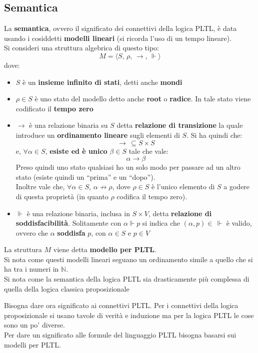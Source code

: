 \subsection{Semantica}
\begin{definizione}
  La \textbf{semantica}, ovvero il significato dei connettivi della logica PLTL,
  è data usando i cosiddetti \textbf{modelli lineari} (si ricorda l'uso di un
  tempo lineare).\\
  Si consideri una struttura algebrica di questo tipo:
  \[M=\langle S,\,\rho, \,\to, \,\Vdash\rangle\]
  dove:
  \begin{itemize}
    \item $S$ è un \textbf{insieme infinito di stati}, detti anche
    \textbf{mondi}
    \item $\rho \in S$ è uno stato del modello detto anche \textbf{root} o
    \textbf{radice}. In tale stato viene codificato il \textbf{tempo zero}
    \item $\to$ è una relazione binaria su $S$ detta \textbf{relazione di
      transizione} la quale introduce un \textbf{ordinamento lineare} sugli
    elementi di $S$. Si ha quindi che:
    \[\to\,\subseteq S\times S\]
    e, $\forall \alpha \in S$, \textbf{esiste ed è unico} $\beta\in S$ tale che
    vale:
    \[\alpha\to\beta\]
    Preso quindi uno stato qualsiasi ho un solo modo per passare ad un altro
    stato (esiste quindi un ``prima'' e un ``dopo'').\\
    Inoltre vale che, $\forall \alpha\in S$, $\alpha\not\to \rho$, dove $\rho\in
    S$ è l'unico elemento di $S$ a godere di questa proprietà (in quanto $\rho$
    codifica il tempo zero). 
    \item $\Vdash$ è una relazione binaria, inclusa in $S\times V$, detta
    \textbf{relazione di soddisfacibilità}. Solitamente con $\alpha\Vdash p$
    si indica che $(\alpha, p)\in\,\Vdash$ è valido, ovvero che $\alpha$
    \textbf{soddisfa} $p$, con $\alpha\in S$ e $p\in V$
  \end{itemize}
  La struttura $M$ viene detta \textbf{modello per PLTL}.\\
  Si nota come questi modelli lineari seguano un ordinamento simile a quello che
  si ha tra i numeri in $\mathbb{N}$.\\ 
  Si nota come la semantica della logica PLTL sia drasticamente più complessa
  di quella della logica classica proposizionale 
\end{definizione}

Bisogna dare ora significato ai connettivi PLTL. Per i connettivi della logica
proposizionale si usano tavole di verità e induzione ma per la logica PLTL le
cose sono un po' diverse.\\
Per dare un significato alle formule del linguaggio PLTL bisogna basarsi sui
modelli per PLTL.\\

